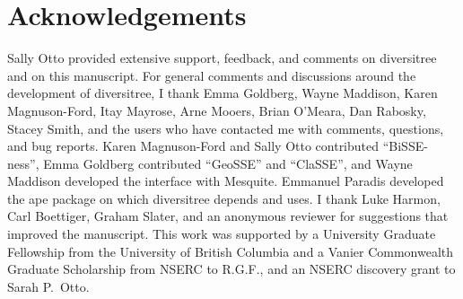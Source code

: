 \documentclass[12pt]{article}
\begin{document}
\section{Acknowledgements}
Sally Otto provided extensive support, feedback, and comments on
diversitree and on this manuscript.
%
For general comments and discussions around the development of
diversitree, I thank Emma Goldberg, Wayne Maddison, Karen
Magnuson-Ford, Itay Mayrose, Arne Mooers, Brian O'Meara, Dan Rabosky,
Stacey Smith, and the users who have contacted me with comments,
questions, and bug reports.
%
Karen Magnuson-Ford and Sally Otto contributed ``BiSSE-ness'', Emma
Goldberg contributed ``GeoSSE'' and ``ClaSSE'', and Wayne Maddison
developed the interface with Mesquite.  Emmanuel Paradis developed the
ape package on which diversitree depends and uses.
%
I thank Luke Harmon, Carl Boettiger, Graham Slater, and an anonymous
reviewer for suggestions that improved the manuscript.
%
This work was supported by a University Graduate Fellowship from the
University of British Columbia and a Vanier Commonwealth Graduate
Scholarship from NSERC to R.G.F., and an NSERC discovery grant to
Sarah P.\ Otto.




\end{document}
